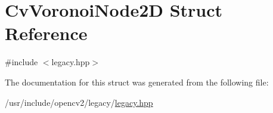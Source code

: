 \hypertarget{structCvVoronoiNode2D}{\section{Cv\-Voronoi\-Node2\-D Struct Reference}
\label{structCvVoronoiNode2D}
}


{\ttfamily \#include $<$legacy.\-hpp$>$}



The documentation for this struct was generated from the following file\-:\begin{DoxyCompactItemize}
\item 
/usr/include/opencv2/legacy/\hyperlink{legacy_8hpp}{legacy.\-hpp}\end{DoxyCompactItemize}
